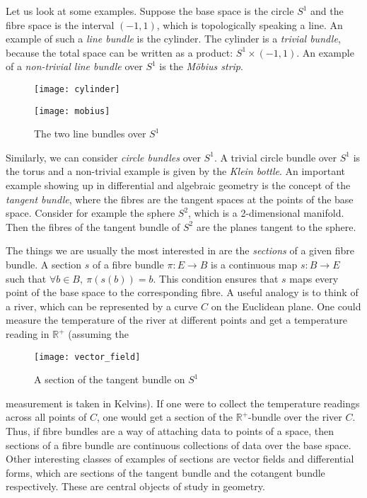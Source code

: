 Let us look at some examples. Suppose the base space is the circle $S^{1}$
and the fibre space is the interval $(-1, 1)$, which is topologically
speaking a line. An example of such a \emph{line bundle} is the cylinder.
The cylinder is a \emph{trivial bundle}, because the total space can
be written as a product: $S^{1}\times (-1,1)$. An example of a
\emph{non-trivial line bundle} over $S^{1}$ is the \emph{Möbius strip}.
\begin{figure}[H]
  \centering
  \begin{minipage}{.45\textwidth}
    \centering
    \texttt{[image: cylinder]}
  \end{minipage}%
  \begin{minipage}{.45\textwidth}
    \centering
    \texttt{[image: mobius]}
  \end{minipage}
  \caption{The two line bundles over $S^{1}$}
\end{figure}
Similarly, we can consider \emph{circle bundles} over $S^{1}$. A trivial
circle bundle over $S^{1}$ is the torus and a non-trivial example is given
by the \emph{Klein bottle}.
An important example showing up in differential and algebraic geometry
is the concept of the \emph{tangent bundle}, where the fibres are the
tangent spaces at the points of the base space. Consider for example the
sphere $S^{2}$, which is a 2-dimensional manifold. Then the fibres of 
the tangent bundle of $S^{2}$ are the planes tangent to the sphere.

The things we are usually the most interested in are the \emph{sections} of
a given fibre bundle. A section $s$ of a fibre bundle $\pi:E\to B$
is a continuous map $s:B\to E$ such that $\forall b\in B,\ \pi(s(b))=b$.
This condition ensures that $s$ maps every point of the base space to the
corresponding fibre. A useful analogy is to think of a river, which can
be represented by a curve $C$ on the Euclidean plane. One could measure the
temperature of the river at different points and get a temperature reading
in $\mathbb{R}^{+}$ (assuming the
\begin{wrapfigure}{r}{0.3\textwidth} %
  \centering
  \texttt{[image: vector\_field]}
  \caption{A section of the tangent bundle on $S^{1}$}
\end{wrapfigure}
 measurement is taken in Kelvins).
If one were to collect the temperature readings across all points of $C$,
one would get a section of the $\mathbb{R}^{+}$-bundle over the river $C$.
Thus, if fibre bundles are a way of attaching data to points of a space,
then sections of a fibre bundle are continuous collections of data over the
base space. Other interesting classes of examples of sections are vector
fields and differential forms, which are sections of the tangent bundle
and the cotangent bundle respectively. These are central objects of study
in geometry.

